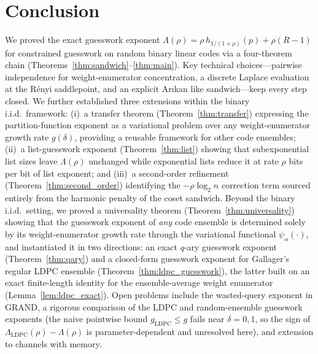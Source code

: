 \documentclass[journal,10pt,onecolumn]{IEEEtran}
\begin{document}
\section{Conclusion}
\label{sec:conclusion}
We proved the exact guesswork exponent
$\Lambda(\rho)=\rho\, h_{1/(1+\rho)}(p)+\rho(R-1)$
for constrained guesswork on random binary linear codes via a
four-theorem chain (Theorems~\ref{thm:sandwich}--\ref{thm:main}).
Key technical choices---pairwise independence for weight-enumerator
concentration, a discrete Laplace evaluation at the R\'{e}nyi
saddlepoint, and an explicit Ar{\i}kan like sandwich---keep every step
closed.
We further established three extensions within the binary
i.i.d.\ framework: (i)~a transfer theorem
(Theorem~\ref{thm:transfer}) expressing the partition-function
exponent as a variational problem over any weight-enumerator growth
rate $g(\delta)$, providing a reusable framework for other code
ensembles; (ii)~a list-guesswork exponent
(Theorem~\ref{thm:list}) showing that subexponential list sizes
leave $\Lambda(\rho)$ unchanged while exponential lists reduce it at
rate $\rho$ bits per bit of list exponent; and (iii)~a
second-order refinement (Theorem~\ref{thm:second_order}) identifying
the $-\rho\log_2 n$ correction term sourced entirely from the
harmonic penalty of the coset sandwich.
Beyond the binary i.i.d.\ setting, we proved a universality theorem
(Theorem~\ref{thm:universality}) showing that the guesswork exponent
of \emph{any} code ensemble is determined solely by its
weight-enumerator growth rate through the variational functional
$\psi_\alpha(\cdot)$, and instantiated it in two directions: an exact
$q$-ary guesswork exponent (Theorem~\ref{thm:qary}) and a closed-form
guesswork exponent for Gallager's regular LDPC ensemble
(Theorem~\ref{thm:ldpc_guesswork}), the latter built on an exact
finite-length identity for the ensemble-average weight enumerator
(Lemma~\ref{lem:ldpc_exact}).
Open problems include the wasted-query exponent in GRAND, a rigorous
comparison of the LDPC and random-ensemble guesswork exponents (the
naive pointwise bound $g_{\mathrm{LDPC}}\le g$ fails near $\delta=0,1$,
so the sign of $\Lambda_{\mathrm{LDPC}}(\rho)-\Lambda(\rho)$ is
parameter-dependent and unresolved here), and extension to channels
with memory.
\end{document}
